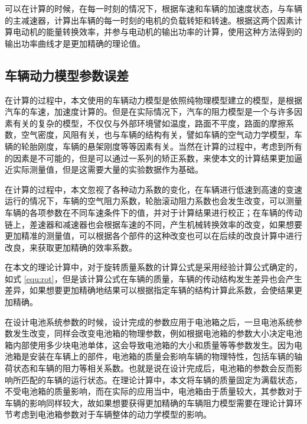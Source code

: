 可以在计算的时候，在每一时刻的情况下，根据车速和车辆的加速度状态，与车辆的主减速器，计算出车辆的每一时刻的电机的负载转矩和转速。根据这两个因素计算电动机的能量转换效率，并参与电动机的输出功率的计算，使用这种方法得到的输出功率曲线才是更加精确的理论值。

\subsection{车辆动力模型参数误差}
在计算的过程中，本文使用的车辆动力模型是依照纯物理模型建立的模型，是根据汽车的车速，加速度计算的。但是在实际情况下，汽车的阻力模型是一个与许多因素有关的复杂的模型，不仅仅与外部环境譬如温度，路面不平度，路面的摩擦系数，空气密度，风阻有关，也与车辆的结构有关，譬如车辆的空气动力学模型，车辆的轮胎刚度，车辆的悬架刚度等等因素有关。当然在计算的过程中，考虑到所有的因素是不可能的，但是可以通过一系列的矫正系数，来使本文的计算结果更加逼近实际测量值，但是这需要大量的实验数据作为基础。

在计算的过程中，本文忽视了各种动力系数的变化，在车辆进行低速到高速的变速运行的情况下，车辆的空气阻力系数，轮胎滚动阻力系数也会发生改变，可以测量车辆的各项参数在不同车速条件下的值，并对于计算结果进行校正；在车辆的传动链上，差速器和减速器也会根据车速的不同，产生机械转换效率的改变，如果想要更加精准的测量值，可以根据各个部件的这种改变也可以在后续的改良计算中进行改良，来获取更加精确的效率系数。

在本文的理论计算中，对于旋转质量系数的计算公式是采用经验计算公式确定的，如式 \ref{equ:rot}，但是该计算公式在车辆的质量，车辆的传动结构发生差异也会产生差异，如果想要更加精确地结果可以根据指定车辆的结构计算此系数，会使结果更加精确。

在设计电池系统参数的时候，设计完成的参数应用于电池箱之后，一旦电池系统参数发生改变，同样会改变电池箱的物理参数，例如根据电池箱的参数大小决定电池箱内部使用多少块电池单体，这会导致电池箱的大小和质量等等参数发生。因为电池箱是安装在车辆上的部件，电池箱的质量会影响车辆的物理特性，包括车辆的轴荷状态和车辆的阻力等相关系数。也就是说在设计完成后，电池箱的参数会反而影响所匹配的车辆的运行状态。在理论计算中，本文将车辆的质量固定为满载状态，不受电池箱的质量影响，而在实际的应用当中，电池箱由于质量较大，其参数对于车辆的影响同样较大，故如果想要获得更加精确的车辆阻力模型需要在理论计算环节考虑到电池箱参数对于车辆整体的动力学模型的影响。

